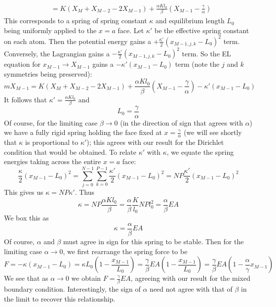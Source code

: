 \documentclass[letterpaper,12pt]{article}
\begin{document}
\begin{flushleft}
\begin{align*}
        &= K(X_{M} + X_{M-2} - 2X_{M-1}) + \frac{\alpha Kl_0}{\beta}\left(X_{M-1} - \frac{\gamma}{\alpha}\right)
    \end{align*}
    This corresponds to a spring of spring constant $\kappa$ and equilibrium length $L_0$ being uniformly applied to the $x=a$ face. Let $\kappa'$ be the effective spring constant on each atom. Then the potential energy gains a $+\frac{\kappa'}{2}\left(x_{M-1,j,k} - L_0\right)^2$ term. Conversely, the Lagrangian gains a $-\frac{\kappa'}{2}\left(x_{M-1,j,k} - L_0\right)^2$ term. So the EL equation for $x_{M-1} \to X_{M-1}$ gains a $-\kappa'\left(x_{M-1} - L_0\right)$ term (note the $j$ and $k$ symmetries being preserved):
    $$mX_{M-1} = K(X_{M} + X_{M-2} - 2X_{M-1}) + \frac{\alpha Kl_0}{\beta}\left(X_{M-1} - \frac{\gamma}{\alpha}\right) - \kappa'\left(x_{M-1} - L_0\right)$$
    It follows that $\kappa' = \frac{\alpha Kl_0}{\beta}$ and
    $$\boxed{L_0 = \frac{\gamma}{\alpha}}$$
    Of course, for the limiting case $\beta \to 0$ (in the direction of sign that agrees with $\alpha$) we have a fully rigid spring holding the face fixed at $x = \frac{\gamma}{\alpha}$ (we will see shortly that $\kappa$ is proportional to $\kappa'$); this agrees with our result for the Dirichlet condition that would be obtained. To relate $\kappa'$ with $\kappa$, we equate the spring energies taking across the entire $x=a$ face:
    $$\frac{\kappa}{2} \left(x_{M-1} - L_0\right)^2 = \sum_{j=0}^{N-1}\sum_{k=0}^{P-1}\frac{\kappa'}{2} \left(x_{M-1} - L_0\right)^2 = NP\frac{\kappa'}{2} \left(x_{M-1} - L_0\right)^2$$
    This gives us $\kappa = NP\kappa'$. Thus
    $$\kappa = NP\frac{\alpha Kl_0}{\beta} = \frac{\alpha}{\beta} \frac{K}{l_0} NPl_0^2 = \frac{\alpha}{\beta}EA$$
    We box this as
    $$\boxed{\kappa = \frac{\alpha}{\beta}EA}$$
    Of course, $\alpha$ and $\beta$ must agree in sign for this spring to be stable. Then for the limiting case $\alpha \to 0$, we first rearrange the spring force to be
    $$F = -\kappa\left(x_{M-1} - L_0\right) = \kappa L_0\left(1 - \frac{x_{M-1}}{L_0}\right) = \frac{\gamma}{\beta}EA\left(1 - \frac{x_{M-1}}{L_0}\right) = \frac{\gamma}{\beta}EA\left(1 - \frac{\alpha}{\gamma}x_{M-1}\right)$$
    We see that as $\alpha \to 0$ we obtain $F = \frac{\gamma}{\beta}EA$, agreeing with our result for the mixed boundary condition. Interestingly, the sign of $\alpha$ need not agree with that of $\beta$ in the limit to recover this relationship.

\end{flushleft}
\end{document}
